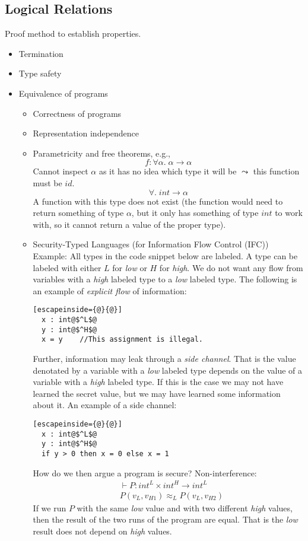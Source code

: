 \documentclass[a4paper,10pt,fleqn]{article}
\newcommand{\tarrow}[2]{\ensuremath{ #1 \rightarrow #2}}
\begin{document}
\subsection*{Logical Relations}
Proof method to establish properties.
\begin{itemize}
\item Termination
\item Type safety
\item Equivalence of programs
  \begin{itemize}
  \item Correctness of programs
  \item Representation independence
  \item Parametricity and free theorems, e.g.,
    \[
    f: \forall \alpha. \; \tarrow{\alpha}{\alpha}
    \]
    Cannot inspect $\alpha$ as it has no idea which type it will be $\leadsto$ this function must be $id$.
    \[
    \forall. \; \tarrow{int}{\alpha}
    \]
    A function with this type does not exist (the function would need to return something of type $\alpha$, but it only has something of type $int$ to work with, so it cannot return a value of the proper type).
  \item Security-Typed Languages (for Information Flow Control (IFC))\\
        Example: All types in the code snippet below are labeled. A type can be labeled with either $L$ for \emph{low} or $H$ for \emph{high}. We do not want any flow from variables with a \emph{high} labeled type to a \emph{low} labeled type. The following is an example of \emph{explicit flow} of information:
        \begin{lstlisting}[escapeinside={@}{@}]
  x : int@$^L$@
  y : int@$^H$@
  x = y    //This assignment is illegal.
        \end{lstlisting}
Further, information may leak through a \emph{side channel}. That is the value denotated by a variable with a \emph{low} labeled type depends on the value of a variable with a \emph{high} labeled type. If this is the case we may not have learned the secret value, but we may have learned some information about it. An example of a side channel:
        \begin{lstlisting}[escapeinside={@}{@}]
  x : int@$^L$@
  y : int@$^H$@
  if y > 0 then x = 0 else x = 1
        \end{lstlisting}
How do we then argue a program is secure? Non-interference:
\begin{align*}
  & \vdash P : \tarrow{int^L \times int^H}{int^L} \\
  & P(v_L,v_{H1}) \approx_L P(v_L,v_{H2})
\end{align*}
If we run $P$ with the same \emph{low} value and with two different \emph{high} values, then the result of the two runs of the program are equal. That is the \emph{low} result does not depend on \emph{high} values.
  \end{itemize}
\end{itemize}
\end{document}
